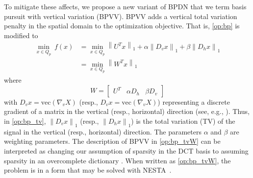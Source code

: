 \documentclass[twocolumn,oneside]{IEEEtran/IEEEtran}
\begin{document}
To mitigate these affects, we propose a new variant of BPDN that we
term basis pursuit with vertical variation (BPVV). BPVV adds a
vertical total variation penalty in the spatial domain to the
optimization objective. That is, \eqref{op:bp} is modified to 
\begin{align}
  \min_{x\in Q_p}~f(x) &= \min_{x\in Q_p} \left\|U^Tx\right\|_1
                         + \alpha\left\|D_vx\right\|_1
                         + \beta\left\|D_hx\right\|_1 \label{op:bp_tv}\\
                       &=\min_{x\in Q_p} \left\|W^Tx\right\|_1 \label{op:bp_tvW}
\end{align}
where
\begin{equation*}
  W = \begin{bmatrix}U^T&\alpha D_h&\beta D_v \end{bmatrix}
\end{equation*}
with ${D_v x=\text{vec}(\nabla_v X)}$ (resp.,
${D_v x=\text{vec}(\nabla_v X)}$) representing a discrete gradient of
a matrix in the vertical (resp., horizontal) direction (see, e.g.,
\cite[Section 6.1,]{becker_nesta_2011}).
Thus, in \eqref{op:bp_tv}, $\left \| D_v x \right \|_1$ (resp.,
$\left \| D_h x \right \|_1$) is the total variation (TV) of the
signal in the vertical (resp., horizontal) direction. The parameters
$\alpha$ and $\beta$ are weighting parameters. The description of BPVV
in \eqref{op:bp_tvW} can be interpreted as changing our assumption of
sparsity in the DCT basis to assuming sparsity in an overcomplete
dictionary \cite{candes_redundant_2011}.  When written as
\eqref{op:bp_tvW}, the problem is in a form that may be solved with
NESTA~\cite{becker_nesta_2011}.
\end{document}
